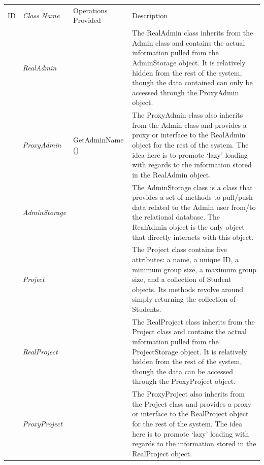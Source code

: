 \documentclass[12pt,letterpaper]{article}
\begin{document}
\begin{center}
\begin{tabu} to 
	\tableheader{}ID & Class Name & Operations Provided & Description \\
	 & RealAdmin & & The RealAdmin class inherits from the Admin class and contains the actual information pulled from the AdminStorage object. It is relatively hidden from the rest of the system, though the data contained can only be accessed through the ProxyAdmin object. \\
	 & ProxyAdmin & GetAdminName () & The ProxyAdmin class also inherits from the Admin class and provides a proxy or interface to the RealAdmin object for the rest of the system. The idea here is to promote `lazy' loading with regards to the information stored in the RealAdmin object.\\
	 & AdminStorage & & The AdminStorage class is a class that provides a set of methods to pull/push data related to the Admin user from/to the relational database. The RealAdmin object is the only object that directly interacts with this object.\\
	 & Project & & The Project class contains five attributes: a name, a unique ID, a minimum group size, a maximum group size, and a collection of Student objects. Its methods revolve around simply returning the collection of Students.\\
	 & RealProject & & The RealProject class inherits from the Project class and contains the actual information pulled from the ProjectStorage object. It is relatively hidden from the rest of the system, though the data can be accessed through the ProxyProject object.\\
	 & ProxyProject & & The ProxyProject also inherits from the Project class and provides a proxy or interface to the RealProject object for the rest of the system. The idea here is to promote `lazy' loading with regards to the information stored in the RealProject object.\\
\end{tabu}
\end{center}
\end{document}
